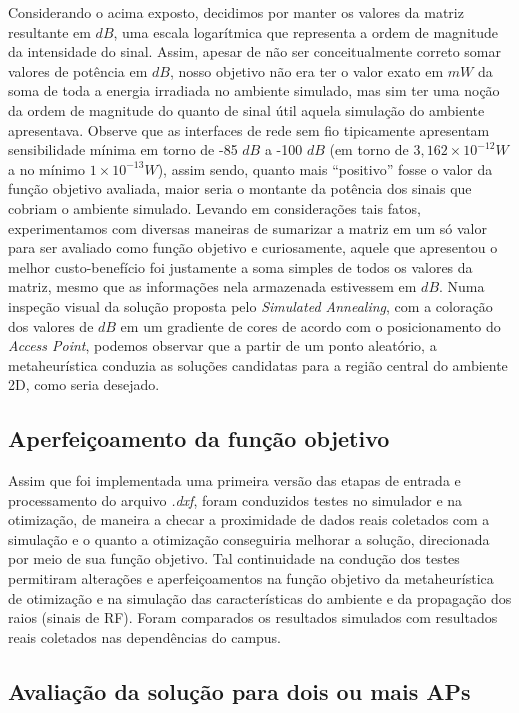 \documentclass[
	12pt,				%
	twoside,			%
	a4paper,			%
	english,			%
	french,				%
	spanish,			%
	brazil				%
	]{abntex2}
\begin{document}
Considerando o acima exposto, decidimos por manter os valores da matriz
resultante em \(dB\), uma escala logarítmica que representa a ordem de
magnitude da intensidade do sinal. Assim, apesar de não ser
conceitualmente correto somar valores de potência em \(dB\), nosso
objetivo não era ter o valor exato em \(mW\) da soma de toda a energia
irradiada no ambiente simulado, mas sim ter uma noção da ordem de
magnitude do quanto de sinal útil aquela simulação do ambiente
apresentava. Observe que as interfaces de rede sem fio tipicamente
apresentam sensibilidade mínima em torno de -85 \(dB\) a -100 \(dB\) (em
torno de \(3,162\times10^{-12} W\) a no mínimo \(1\times10^{-13} W\)),
assim sendo, quanto mais ``positivo'' fosse o valor da função objetivo
avaliada, maior seria o montante da potência dos sinais que cobriam o
ambiente simulado. Levando em considerações tais fatos, experimentamos
com diversas maneiras de sumarizar a matriz em um só valor para ser
avaliado como função objetivo e curiosamente, aquele que apresentou o
melhor custo-benefício foi justamente a soma simples de todos os valores
da matriz, mesmo que as informações nela armazenada estivessem em
\(dB\). Numa inspeção visual da solução proposta pelo \emph{Simulated
Annealing}, com a coloração dos valores de \(dB\) em um gradiente de
cores de acordo com o posicionamento do \emph{Access Point}, podemos
observar que a partir de um ponto aleatório, a metaheurística conduzia
as soluções candidatas para a região central do ambiente 2D, como seria
desejado.

\subsection{Aperfeiçoamento da função
objetivo}\label{aperfeiuxe7oamento-da-funuxe7uxe3o-objetivo}

Assim que foi implementada uma primeira versão das etapas de entrada e
processamento do arquivo \emph{.dxf}, foram conduzidos testes no
simulador e na otimização, de maneira a checar a proximidade de dados
reais coletados com a simulação e o quanto a otimização conseguiria
melhorar a solução, direcionada por meio de sua função objetivo. Tal
continuidade na condução dos testes permitiram alterações e
aperfeiçoamentos na função objetivo da metaheurística de otimização e na
simulação das características do ambiente e da propagação dos raios
(sinais de RF). Foram comparados os resultados simulados com resultados
reais coletados nas dependências do campus.

\subsection{Avaliação da solução para dois ou mais
APs}\label{sec:avalia_dois_ou_mais}
\end{document}

